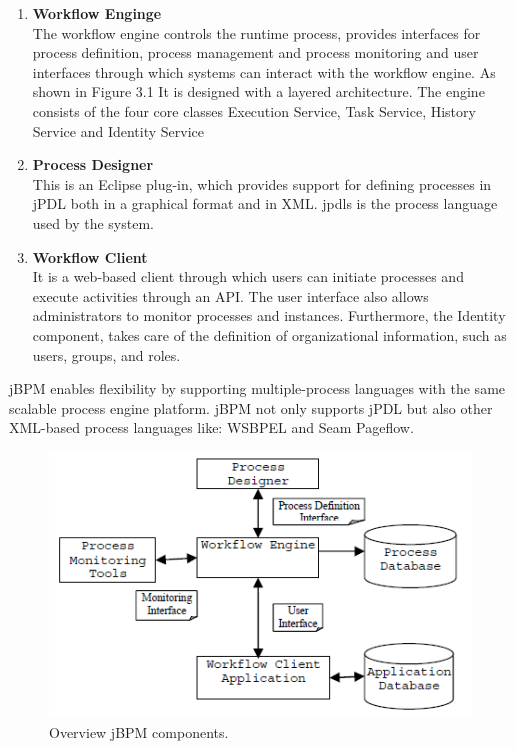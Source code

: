 \begin{enumerate} %
	\item \textbf{Workflow Enginge} 
	\\The workflow engine controls the runtime process, provides interfaces for process definition, process management and process monitoring and user interfaces through which systems can interact with the workflow engine. As shown in Figure 3.1
	It is designed with a layered architecture.
	The engine consists of the four core classes Execution Service, Task Service, History Service and Identity Service \cite{.2018}
	\item \textbf{Process Designer}
	\\This is an Eclipse plug-in, which provides support for defining
	processes in jPDL both in a graphical format and in XML. \glspl{jpdl} is the process language used by the system. \cite{TerHofstede.2010}
	\item \textbf{Workflow Client}
	\\ It is a
	web-based client through which users can initiate processes and execute activities through an API.
	The user interface also allows administrators to monitor processes and instances. Furthermore, the Identity component, takes care of	the definition of organizational information, such as users, groups, and roles.\cite{TerHofstede.2010}

\end{enumerate}


\newpage
jBPM enables flexibility by supporting
multiple-process languages with the same scalable process
engine platform. jBPM not only supports jPDL but also other 
XML-based process languages like: \gls{WSBPEL} and Seam Pageflow. \cite{Zhang.2008}
\\

\begin{figure}[!hb]
	\centering
	\includegraphics[scale=0.85]{jBPM}
	\caption{Overview jBPM components. \cite{ParedesVillegas.1993}}
\end{figure}

